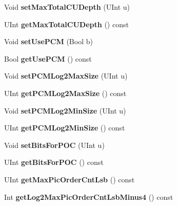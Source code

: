 \begin{DoxyCompactItemize}
Void {\bfseries set\+Max\+Total\+C\+U\+Depth} (U\+Int u)
\item 
\mbox{\label{class_t_com_s_p_s_a078827e6e1d12f7f6d5bd493a0dc3fd6}} 
U\+Int {\bfseries get\+Max\+Total\+C\+U\+Depth} () const
\item 
\mbox{\label{class_t_com_s_p_s_aa8c18339c7f8a64b457b2591ce1e0daa}} 
Void {\bfseries set\+Use\+P\+CM} (Bool b)
\item 
\mbox{\label{class_t_com_s_p_s_a60622af207998aa636bac2ae7783f20d}} 
Bool {\bfseries get\+Use\+P\+CM} () const
\item 
\mbox{\label{class_t_com_s_p_s_aace76d26eaba90398db00ef53795491a}} 
Void {\bfseries set\+P\+C\+M\+Log2\+Max\+Size} (U\+Int u)
\item 
\mbox{\label{class_t_com_s_p_s_a95a185d70a3552d9b927bb30df1624ac}} 
U\+Int {\bfseries get\+P\+C\+M\+Log2\+Max\+Size} () const
\item 
\mbox{\label{class_t_com_s_p_s_a8217bd64f5708c603636a7bb1a1c3f08}} 
Void {\bfseries set\+P\+C\+M\+Log2\+Min\+Size} (U\+Int u)
\item 
\mbox{\label{class_t_com_s_p_s_a1610532532173366b7e0f3654f7f197f}} 
U\+Int {\bfseries get\+P\+C\+M\+Log2\+Min\+Size} () const
\item 
\mbox{\label{class_t_com_s_p_s_a30a793f53b6fc50df1b9f4588c850010}} 
Void {\bfseries set\+Bits\+For\+P\+OC} (U\+Int u)
\item 
\mbox{\label{class_t_com_s_p_s_a424c057d4fd0c1bee7f871134a85fe67}} 
U\+Int {\bfseries get\+Bits\+For\+P\+OC} () const
\item 
\mbox{\label{class_t_com_s_p_s_a559a7e85d58c98ac84cdfdb55c7c6398}} 
U\+Int {\bfseries get\+Max\+Pic\+Order\+Cnt\+Lsb} () const
\item 
\mbox{\label{class_t_com_s_p_s_a8d4a7c9feb1f6a3aa1aebcfb6e449f4b}} 
Int {\bfseries get\+Log2\+Max\+Pic\+Order\+Cnt\+Lsb\+Minus4} () const

\end{DoxyCompactItemize}
